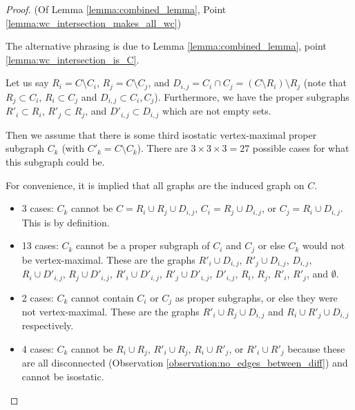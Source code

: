 \begin{proof} (Of Lemma \ref{lemma:combined_lemma}, Point \ref{lemma:wc_intersection_makes_all_wc})

The alternative phrasing is due to Lemma \ref{lemma:combined_lemma}, point \ref{lemma:wc_intersection_is_C}.

Let us say $R_i=C\setminus C_i$, $R_j=C\setminus C_j$, and $D_{i,j}=C_i\cap C_j=(C\setminus R_i)\setminus R_j$ (note that $R_j\subset C_i$, $R_i\subset C_j$ and $D_{i,j}\subset C_i,C_j$). Furthermore, we have the proper subgraphs $R'_i\subset R_i$, $R'_j\subset R_j$, and $D'_{i,j}\subset D_{i,j}$ which are not empty sets.

Then we assume that there is some third isostatic vertex-maximal proper subgraph $C_k$ (with $C'_k=C\setminus C_k$). There are $3\times 3\times 3 = 27$ possible cases for what this subgraph could be.

For convenience, it is implied that all graphs are the induced graph on $C$.
\newcommand{\inducedOnC}[1]{#1}


\begin{itemize}
    \item 3 cases: $C_k$ cannot be $C=\inducedOnC{R_i\cup R_j\cup D_{i,j}}$, $C_i=\inducedOnC{R_j\cup D_{i,j}}$, or $C_j=\inducedOnC{R_i\cup D_{i,j}}$. This is by definition.

    \item 13 cases: $C_k$ cannot be a proper subgraph of $C_i$ and $C_j$ or else $C_k$ would not be vertex-maximal. These are the graphs $\inducedOnC{R'_i\cup D_{i,j}}$, $\inducedOnC{R'_j\cup D_{i,j}}$, $\inducedOnC{ D_{i,j}}$, $\inducedOnC{R_i\cup D'_{i,j}}$, $\inducedOnC{R_j\cup D'_{i,j}}$, $\inducedOnC{R'_i\cup D'_{i,j}}$, $\inducedOnC{R'_j\cup D'_{i,j}}$, $\inducedOnC{ D'_{i,j}}$, $\inducedOnC{R_i}$, $\inducedOnC{R_j}$, $\inducedOnC{R'_i}$, $\inducedOnC{R'_j}$, and $\inducedOnC{\emptyset}$.

    \item 2 cases: $C_k$ cannot contain $C_i$ or $C_j$ as proper subgraphs, or else they were not vertex-maximal. These are the graphs $\inducedOnC{R'_i\cup R_j\cup D_{i,j}}$ and $\inducedOnC{R_i\cup R'_j\cup D_{i,j}}$ respectively.

    \item 4 cases: \usestwod $C_k$ cannot be $\inducedOnC{R_i\cup R_j}$, $\inducedOnC{R'_i\cup R_j}$, $\inducedOnC{R_i\cup R'_j}$, or $\inducedOnC{R'_i\cup R'_j}$ because these are all disconnected (Observation \ref{observation:no_edges_between_diff}) and cannot be isostatic.


\end{itemize}
\end{proof}
